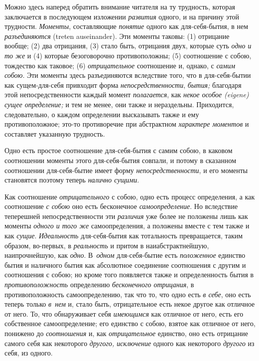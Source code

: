 Можно здесь наперед обратить внимание читателя на ту трудность, которая
заключается в последующем изложении {\em развития}
одного, и на причину этой трудности. {\em Моменты},
составляющие {\em понятие} одного как для-себя-бытия, в
нем {\em разъединяются} (treten auseinander). Эти
моменты таковы: (1) отрицание вообще; (2) два отрицания, (3) стало быть,
отрицания двух, которые суть {\em одно и то же} и (4)
которые безоговорочно противоположны; (5) соотношение с собою, тождество
как таковое; (6) {\em отрицательное} соотношение и,
однако, с {\em самим собою}. Эти моменты здесь
разъединяются вследствие того, что в для-себя-бытии как сущем-для-себя
привходит форма {\em непосредственности},
{\em бытия;} благодаря этой непосредственности каждый
момент {\em полагается}, как
{\em некое особое (eigene) сущее определение;} и тем не
менее, они также и нераздельны. Приходится, следовательно, о каждом
определении высказывать также и ему противоположное; это-то противоречие
при абстрактном {\em характере моментов} и составляет указанную трудность.


Одно есть простое соотношение для-себя-бытия с самим собою, в каковом
соотношении моменты этого для-себя-бытия совпали, и потому в сказанном
соотношении для-себя-бытие имеет форму
{\em непосредственности}, и его моменты становятся
поэтому теперь {\em налично сущими}.

Как соотношение {\em отрицательного} с собою, одно есть
процесс определения, а как соотношение {\em с собою}
оно есть бесконечное {\em самоопределение}. Но
вследствие теперешней непосредственности эти
{\em различия} уже более не положены лишь как моменты
{\em одного и того же} самоопределения, а положены
вместе с тем также и как {\em сущие}.
{\em Идеальность} для-себя-бытия как тотальность
превращается, таким образом, во-первых, в
{\em реальность} и притом в наиабстрактнейшую,
наипрочнейшую, как {\em одно}. В~{\em одном} для-себя-бытие есть
{\em положенное} единство бытия и наличного бытия как
абсолютное соединение соотношения с другим и соотношения с собою; но кроме
того появляется также и определенность бытия в
{\em противоположность} определению
{\em бесконечного отрицания}, в противоположность
самоопределению, так что то, что одно есть {\em в
себе}, оно есть теперь только {\em в~нем} и, стало
быть, отрицательное есть некое другое как отличное от него. То, что
обнаруживает себя {\em имеющимся} как отличное от него,
есть его собственное самоопределение; его единство с собою, взятое как
отличное от него, понижено до {\em соотношения} и, как
{\em отрицательное} единство, оно есть отрицание самого
себя как некоторого {\em другого, исключение} одного как некоторого
{\em другого} из себя, из одного.

